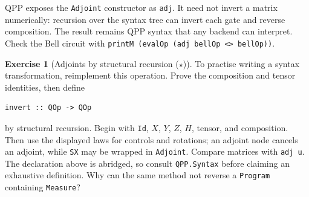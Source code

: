 \documentclass[11pt,a4paper]{article}
\theoremstyle{definition}
\newtheorem{exercise}{Exercise}[section]
\begin{document}
QPP exposes the \lstinline|Adjoint| constructor as \lstinline|adj|.  It need
not invert a matrix numerically: recursion over the syntax tree can invert
each gate and reverse composition.  The result remains QPP syntax that any
backend can interpret.  Check the Bell circuit with
\lstinline|printM (evalOp (adj bellOp <> bellOp))|.

\begin{exercise}[Adjoints by structural recursion ($\star$)]
To practise writing a syntax transformation, reimplement this operation.
Prove the composition and tensor identities, then define
\begin{lstlisting}
invert :: QOp -> QOp
\end{lstlisting}
by structural recursion.  Begin with \lstinline|Id|, $X$, $Y$, $Z$, $H$,
tensor, and composition.  Then use the displayed laws for controls and
rotations; an adjoint node cancels an adjoint, while \lstinline|SX| may be
wrapped in \lstinline|Adjoint|.  Compare matrices with \lstinline|adj u|.
The declaration above is abridged, so consult \lstinline|QPP.Syntax| before
claiming an exhaustive definition.  Why can the same method not reverse a
\lstinline|Program| containing \lstinline|Measure|?
\end{exercise}
\end{document}
